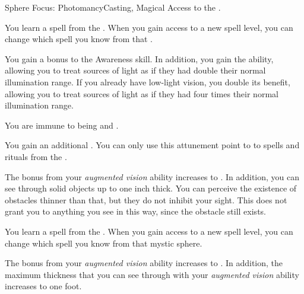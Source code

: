     \begin{feat}{Sphere Focus: Photomancy}{Casting, Magical}
        \featpre Access to the  .

         You learn a spell from the  .
        When you gain access to a new spell level, you can change which spell you know from that .

         You gain a  bonus to the Awareness skill.
        In addition, you gain the  ability, allowing you to treat sources of light as if they had double their normal illumination range.
        If you already have low-light vision, you double its benefit, allowing you to treat sources of light as if they had four times their normal illumination range.

         You are immune to being  and .

         You gain an additional .
        You can only use this attunement point to  to spells and rituals from the  .

         The bonus from your \textit{augmented vision} ability increases to .
        In addition, you can see through solid objects up to one inch thick.
        You can perceive the existence of obstacles thinner than that, but they do not inhibit your sight.
        This does not grant you  to anything you see in this way, since the obstacle still exists.

         You learn a spell from the  .
        When you gain access to a new spell level, you can change which spell you know from that mystic sphere.

         The bonus from your \textit{augmented vision} ability increases to .
        In addition, the maximum thickness that you can see through with your \textit{augmented vision} ability increases to one foot.
    \end{feat}

